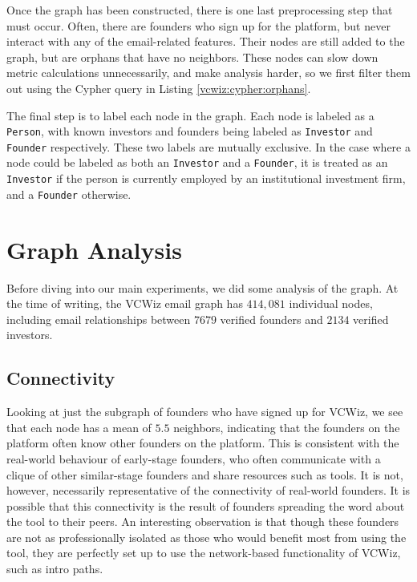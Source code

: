 Once the graph has been constructed, there is one last preprocessing step that must occur. Often, there are founders who sign up for the platform, but never interact with any of the email-related features. Their nodes are still added to the graph, but are orphans that have no neighbors. These nodes can slow down metric calculations unnecessarily, and make analysis harder, so we first filter them out using the Cypher query in Listing \ref{vcwiz:cypher:orphans}.

The final step is to label each node in the graph. Each node is labeled as a \texttt{Person}, with known investors and founders being labeled as \texttt{Investor} and \texttt{Founder} respectively. These two labels are mutually exclusive. In the case where a node could be labeled as both an \texttt{Investor} and a \texttt{Founder}, it is treated as an \texttt{Investor} if the person is currently employed by an institutional investment firm, and a \texttt{Founder} otherwise.

\section{Graph Analysis}

Before diving into our main experiments, we did some analysis of the graph. At the time of writing, the VCWiz email graph has $414,081$ individual nodes, including email relationships between $7679$ verified founders and $2134$ verified investors.

\subsection{Connectivity}

Looking at just the subgraph of founders who have signed up for VCWiz, we see that each node has a mean of $5.5$ neighbors, indicating that the founders on the platform often know other founders on the platform. This is consistent with the real-world behaviour of early-stage founders, who often communicate with a clique of other similar-stage founders and share resources such as tools. It is not, however, necessarily representative of the connectivity of real-world founders. It is possible that this connectivity is the result of founders spreading the word about the tool to their peers. An interesting observation is that though these founders are not as professionally isolated as those who would benefit most from using the tool, they are perfectly set up to use the network-based functionality of VCWiz, such as intro paths.

